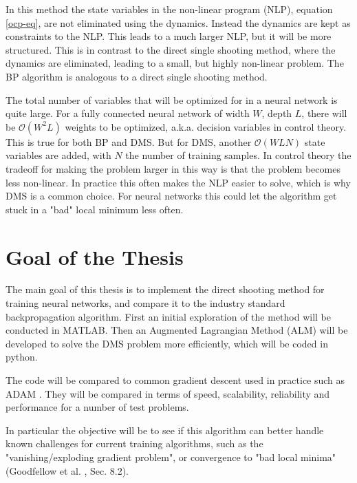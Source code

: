 In this method the state variables in the non-linear program (NLP), equation \ref{ocp-eq}, are not eliminated using the dynamics. Instead the dynamics are kept as constraints to the NLP. This leads to a much larger NLP, but it will be more structured. This is in contrast to the direct single shooting method, where the dynamics are eliminated, leading to a small, but highly non-linear problem. The BP algorithm is analogous to a direct single shooting method.

The total number of variables that will be optimized for in a neural network is quite large. For a fully connected neural network of width $W$, depth $L$, there will be $\mathcal{O}(W^2L)$ weights to be optimized, a.k.a. decision variables in control theory. This is true for both BP and DMS. But for DMS, another $\mathcal{O}(WLN)$ state variables are added, with $N$ the number of training samples. In control theory the tradeoff for making the problem larger in this way is that the problem becomes less non-linear. In practice this often makes the NLP easier to solve, which is why DMS is a common choice. For neural networks this could let the algorithm get stuck in a "bad" local minimum less often.

\section{Goal of the Thesis}
The main goal of this thesis is to implement the direct shooting method for training neural networks, and compare it to the industry standard backpropagation algorithm. First an initial exploration of the method will be conducted in MATLAB. Then an Augmented Lagrangian Method (ALM) will be developed to solve the DMS problem more efficiently, which will be coded in python.

The code will be compared to common gradient descent used in practice such as ADAM \cite{kingma2017adam}. They will be compared in terms of speed, scalability, reliability and performance for a number of test problems.

In particular the objective will be to see if this algorithm can better handle known challenges for current training algorithms, such as the "vanishing/exploding gradient problem", or convergence to "bad local minima" (Goodfellow et al. \cite{Goodfellow-et-al-2016}, Sec. 8.2).



